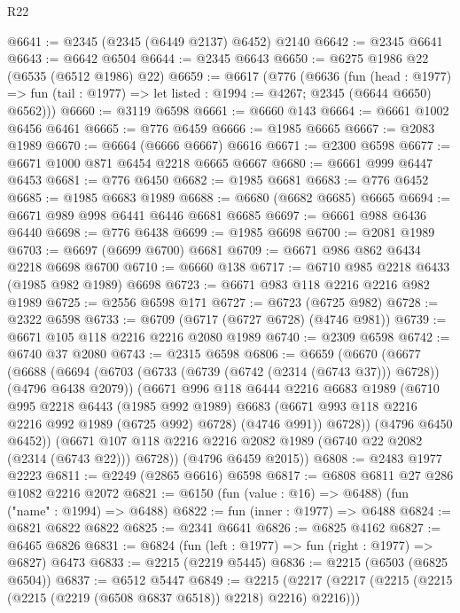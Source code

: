 \begin{lexlean}{R22}
\begin{coremodule}
@6641 := @2345 (@2345 (@6449 @2137) @6452) @2140
@6642 := @2345 @6641
@6643 := @6642 @6504
@6644 := @2345 @6643
@6650 := @6275 @1986 @22 (@6535 (@6512 @1986) @22)
@6659 := @6617
    (@776
      (@6636
        (fun (head : @1977) =>
        fun (tail : @1977) => let listed : @1994 := @4267; @2345 (@6644 @6650) @6562)))
@6660 := @3119 @6598
@6661 := @6660 @143
@6664 := @6661 @1002 @6456 @6461
@6665 := @776 @6459
@6666 := @1985 @6665
@6667 := @2083 @1989
@6670 := @6664 (@6666 @6667) @6616
@6671 := @2300 @6598
@6677 := @6671 @1000 @871 @6454 @2218 @6665 @6667
@6680 := @6661 @999 @6447 @6453
@6681 := @776 @6450
@6682 := @1985 @6681
@6683 := @776 @6452
@6685 := @1985 @6683 @1989
@6688 := @6680 (@6682 @6685) @6665
@6694 := @6671 @989 @998 @6441 @6446 @6681 @6685
@6697 := @6661 @988 @6436 @6440
@6698 := @776 @6438
@6699 := @1985 @6698
@6700 := @2081 @1989
@6703 := @6697 (@6699 @6700) @6681
@6709 := @6671 @986 @862 @6434 @2218 @6698 @6700
@6710 := @6660 @138
@6717 := @6710 @985 @2218 @6433 (@1985 @982 @1989) @6698
@6723 := @6671 @983 @118 @2216 @2216 @982 @1989
@6725 := @2556 @6598 @171
@6727 := @6723 (@6725 @982)
@6728 := @2322 @6598
@6733 := @6709 (@6717 (@6727 @6728) (@4746 @981))
@6739 := @6671 @105 @118 @2216 @2216 @2080 @1989
@6740 := @2309 @6598
@6742 := @6740 @37 @2080
@6743 := @2315 @6598
@6806 := @6659
    (@6670
      (@6677
        (@6688
          (@6694
            (@6703 (@6733 (@6739 (@6742 (@2314 (@6743 @37))) @6728)) (@4796 @6438 @2079))
            (@6671
              @996
              @118
              @6444
              @2216
              @6683
              @1989
              (@6710
                @995
                @2218
                @6443
                (@1985 @992 @1989)
                @6683
                (@6671 @993 @118 @2216 @2216 @992 @1989 (@6725 @992) @6728)
                (@4746 @991))
              @6728))
          (@4796 @6450 @6452))
        (@6671 @107 @118 @2216 @2216 @2082 @1989 (@6740 @22 @2082 (@2314 (@6743 @22))) @6728))
      (@4796 @6459 @2015))
@6808 := @2483 @1977 @2223
@6811 := @2249 (@2865 @6616) @6598
@6817 := @6808 @6811 @27 @286 @1082 @2216 @2072
@6821 := @6150 (fun (value : @16) => @6488) (fun ("name" : @1994) => @6488)
@6822 := fun (inner : @1977) => @6488
@6824 := @6821 @6822 @6822
@6825 := @2341 @6641
@6826 := @6825 @4162
@6827 := @6465 @6826
@6831 := @6824 (fun (left : @1977) => fun (right : @1977) => @6827) @6473
@6833 := @2215 (@2219 @5445)
@6836 := @2215 (@6503 (@6825 @6504))
@6837 := @6512 @5447
@6849 := @2215 (@2217 (@2217 (@2215 (@2215 (@2215 (@2219 (@6508 @6837 @6518)) @2218) @2216) @2216)))

\end{coremodule}
\end{lexlean}
